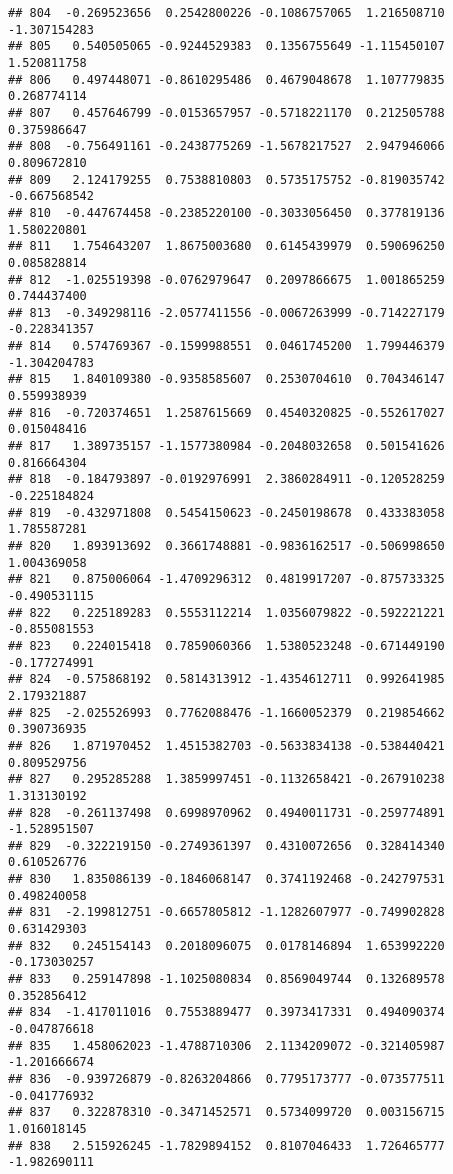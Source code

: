 \documentclass[
]{article}
\begin{document}
\begin{verbatim}
## 804  -0.269523656  0.2542800226 -0.1086757065  1.216508710 -1.307154283
## 805   0.540505065 -0.9244529383  0.1356755649 -1.115450107  1.520811758
## 806   0.497448071 -0.8610295486  0.4679048678  1.107779835  0.268774114
## 807   0.457646799 -0.0153657957 -0.5718221170  0.212505788  0.375986647
## 808  -0.756491161 -0.2438775269 -1.5678217527  2.947946066  0.809672810
## 809   2.124179255  0.7538810803  0.5735175752 -0.819035742 -0.667568542
## 810  -0.447674458 -0.2385220100 -0.3033056450  0.377819136  1.580220801
## 811   1.754643207  1.8675003680  0.6145439979  0.590696250  0.085828814
## 812  -1.025519398 -0.0762979647  0.2097866675  1.001865259  0.744437400
## 813  -0.349298116 -2.0577411556 -0.0067263999 -0.714227179 -0.228341357
## 814   0.574769367 -0.1599988551  0.0461745200  1.799446379 -1.304204783
## 815   1.840109380 -0.9358585607  0.2530704610  0.704346147  0.559938939
## 816  -0.720374651  1.2587615669  0.4540320825 -0.552617027  0.015048416
## 817   1.389735157 -1.1577380984 -0.2048032658  0.501541626  0.816664304
## 818  -0.184793897 -0.0192976991  2.3860284911 -0.120528259 -0.225184824
## 819  -0.432971808  0.5454150623 -0.2450198678  0.433383058  1.785587281
## 820   1.893913692  0.3661748881 -0.9836162517 -0.506998650  1.004369058
## 821   0.875006064 -1.4709296312  0.4819917207 -0.875733325 -0.490531115
## 822   0.225189283  0.5553112214  1.0356079822 -0.592221221 -0.855081553
## 823   0.224015418  0.7859060366  1.5380523248 -0.671449190 -0.177274991
## 824  -0.575868192  0.5814313912 -1.4354612711  0.992641985  2.179321887
## 825  -2.025526993  0.7762088476 -1.1660052379  0.219854662  0.390736935
## 826   1.871970452  1.4515382703 -0.5633834138 -0.538440421  0.809529756
## 827   0.295285288  1.3859997451 -0.1132658421 -0.267910238  1.313130192
## 828  -0.261137498  0.6998970962  0.4940011731 -0.259774891 -1.528951507
## 829  -0.322219150 -0.2749361397  0.4310072656  0.328414340  0.610526776
## 830   1.835086139 -0.1846068147  0.3741192468 -0.242797531  0.498240058
## 831  -2.199812751 -0.6657805812 -1.1282607977 -0.749902828  0.631429303
## 832   0.245154143  0.2018096075  0.0178146894  1.653992220 -0.173030257
## 833   0.259147898 -1.1025080834  0.8569049744  0.132689578  0.352856412
## 834  -1.417011016  0.7553889477  0.3973417331  0.494090374 -0.047876618
## 835   1.458062023 -1.4788710306  2.1134209072 -0.321405987 -1.201666674
## 836  -0.939726879 -0.8263204866  0.7795173777 -0.073577511 -0.041776932
## 837   0.322878310 -0.3471452571  0.5734099720  0.003156715  1.016018145
## 838   2.515926245 -1.7829894152  0.8107046433  1.726465777 -1.982690111

\end{verbatim}
\end{document}
